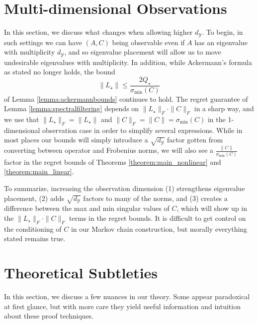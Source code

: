 \documentclass[11pt]{article}
\newcommand{\norm}[1]{\left\lVert#1\right\rVert}
\numberwithin{equation}{section}
\begin{document}
\section{Multi-dimensional Observations} \label{sec:higher-d-y}
In this section, we discuss what changes when allowing higher $d_\mathcal{Y}$. To begin, in such settings we can have $(A, C)$ being observable even if $A$ has an eigenvalue with multiplicity $d_\mathcal{Y}$, and so eigenvalue placement will allow us to move undesirable eigenvalues with multiplicity. In addition, while Ackermann's formula as stated no longer holds, the bound 
$$\norm{L_\star} \leq \frac{2Q_\star}{\sigma_{\text{min}}(C)}$$
of Lemma \ref{lemma:ackermannbounds}
continues to hold. The regret guarantee of Lemma \ref{lemma:spectralfiltering} depends on $\|L_\star\|_F \cdot \|C\|_F$ in a sharp way, and we use that $\|L_\star\|_F = \|L_\star\|$ and $\|C\|_F = \|C\| = \sigma_{\text{min}}(C)$ in the 1-dimensional observation case in order to simplify several expressions. While in most places our bounds will simply introduce a $\sqrt{d_\mathcal{Y}}$ factor gotten from converting between operator and Frobenius norms, we will also see a $\frac{\|C\|}{\sigma_{\text{min}}(C)}$ factor in the regret bounds of Theorems \ref{theorem:main_nonlinear} and \ref{theorem:main_linear}.

To summarize, increasing the observation dimension (1) strengthens eigenvalue placement, (2) adds $\sqrt{d_\mathcal{Y}}$ factors to many of the norms, and (3) creates a difference between the max and min singular values of $C$, which will show up in the $\|L_\star\|_F \cdot \|C\|_F$ terms in the regret bounds. It is difficult to get control on the conditioning of $C$ in our Markov chain construction, but morally everything stated remains true.

\section{Theoretical Subtleties}
In this section, we discuss a few nuances in our theory. Some appear paradoxical at first glance, but with more care they yield useful information and intuition about these proof techniques.
\end{document}
